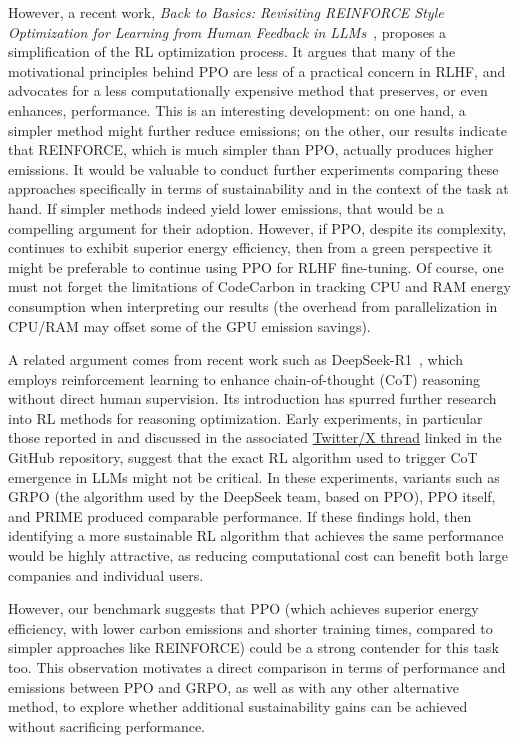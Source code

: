 However, a recent work, \emph{Back to Basics: Revisiting REINFORCE Style Optimization for Learning from Human Feedback in LLMs}~\cite{ahmadian:back_to_basics}, proposes a simplification of the RL optimization process. 
It argues that many of the motivational principles behind PPO are less of a practical concern in RLHF, and 
advocates for a less computationally expensive method that preserves, or even enhances, performance. 
This is an interesting development: on one hand, a simpler method might further reduce emissions; on the other, 
our results indicate that REINFORCE, which is much simpler than PPO, actually produces higher emissions. 
It would be valuable to conduct further experiments comparing these approaches specifically in terms of sustainability and in the context of the task at hand.
If simpler methods indeed yield lower emissions, that would be a compelling argument for their adoption. 
However, if PPO, despite its complexity, continues to exhibit superior energy efficiency, then from a green perspective 
it might be preferable to continue using PPO for RLHF fine-tuning. Of course, one must not forget the limitations of CodeCarbon
in tracking CPU and RAM energy consumption when interpreting our results (the overhead from parallelization in CPU/RAM may offset some of the GPU emission savings).

A related argument comes from recent work such as DeepSeek-R1~\cite{deepseekai:r1}, which employs reinforcement learning to enhance chain-of-thought (CoT) reasoning without direct human supervision. Its introduction has spurred further research into RL methods for reasoning optimization. Early experiments, in particular those reported in \cite{pan:tinyzero} and discussed in the associated \href{https://x.com/jiayi_pirate/status/1882839370505621655}{Twitter/X thread} linked in the GitHub repository, suggest that the exact RL algorithm used to trigger CoT emergence in LLMs might not be critical. In these experiments, variants such as GRPO (the algorithm used by the DeepSeek team, based on PPO), PPO itself, and PRIME produced comparable performance. If these findings hold, then identifying a more sustainable RL algorithm that achieves the same performance would be highly attractive, as reducing computational cost can benefit both large companies and individual users.

However, our benchmark suggests that PPO (which achieves superior energy efficiency, with lower carbon emissions and shorter training times, compared to simpler approaches like REINFORCE) could be a strong contender for this task too. This observation motivates a direct comparison in terms of performance and emissions between PPO and GRPO, as well as with any other alternative method, to explore whether additional sustainability gains can be achieved without sacrificing performance.

